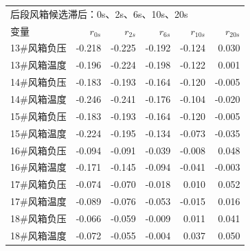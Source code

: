 \documentclass[UTF8,a4paper,zihao=-4]{ctexart}
\begin{document}
\begin{longtable}{lrrrrr}
\midrule
\multicolumn{6}{l}{后段风箱候选滞后：0s、2s、6s、10s、20s} \\
变量 & $r_{0s}$ & $r_{2s}$ & $r_{6s}$ & $r_{10s}$ & $r_{20s}$ \\
\midrule
13\#风箱负压 & -0.218 & -0.225 & -0.192 & -0.124 & 0.030 \\
13\#风箱温度 & -0.196 & -0.224 & -0.198 & -0.122 & 0.001 \\
14\#风箱负压 & -0.183 & -0.193 & -0.164 & -0.120 & -0.005 \\
14\#风箱温度 & -0.246 & -0.241 & -0.176 & -0.104 & -0.020 \\
15\#风箱负压 & -0.183 & -0.193 & -0.164 & -0.120 & -0.005 \\
15\#风箱温度 & -0.224 & -0.195 & -0.134 & -0.073 & -0.035 \\
16\#风箱负压 & -0.094 & -0.091 & -0.039 & -0.008 & 0.048 \\
16\#风箱温度 & -0.171 & -0.145 & -0.094 & -0.041 & -0.003 \\
17\#风箱负压 & -0.074 & -0.070 & -0.018 & 0.010 & 0.052 \\
17\#风箱温度 & -0.089 & -0.076 & -0.053 & -0.015 & 0.016 \\
18\#风箱负压 & -0.066 & -0.059 & -0.009 & 0.011 & 0.041 \\
18\#风箱温度 & -0.072 & -0.055 & -0.004 & 0.037 & 0.050 \\

\end{longtable}
\end{document}
